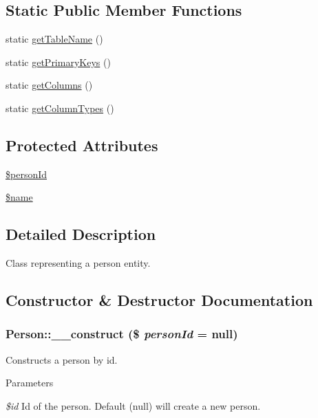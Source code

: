 \subsection*{Static Public Member Functions}
\begin{DoxyCompactItemize}
\item 
static \hyperlink{classPerson_ab68a8aed417028b7755fb8c6c6fb2b62}{getTableName} ()
\item 
static \hyperlink{classPerson_a127a92657a50a2a51c8892dd625af9ee}{getPrimaryKeys} ()
\item 
static \hyperlink{classPerson_aeab90b54dcfecd955b00bd64ceec6eae}{getColumns} ()
\item 
static \hyperlink{classPerson_aed60680c05bbf313249396521da7df27}{getColumnTypes} ()
\end{DoxyCompactItemize}
\subsection*{Protected Attributes}
\begin{DoxyCompactItemize}
\item 
\hyperlink{classPerson_aba3277526264a137afc631ec81e53810}{\$personId}
\item 
\hyperlink{classPerson_a311265986bee974f2812463c8e580887}{\$name}
\end{DoxyCompactItemize}


\subsection{Detailed Description}
Class representing a person entity. 

\subsection{Constructor \& Destructor Documentation}
\hypertarget{classPerson_ae90ab9571c872e6b130d2cf46c1b47ce}{
\subsubsection[{\_\-\_\-construct}]{\setlength{\rightskip}{0pt plus 5cm}Person::\_\-\_\-construct (\$ {\em personId} = {\ttfamily null})}}
\label{classPerson_ae90ab9571c872e6b130d2cf46c1b47ce}
Constructs a person by id.


\begin{DoxyParams}{Parameters}
\item[{\em \$id}]Id of the person. Default (null) will create a new person. \end{DoxyParams}



